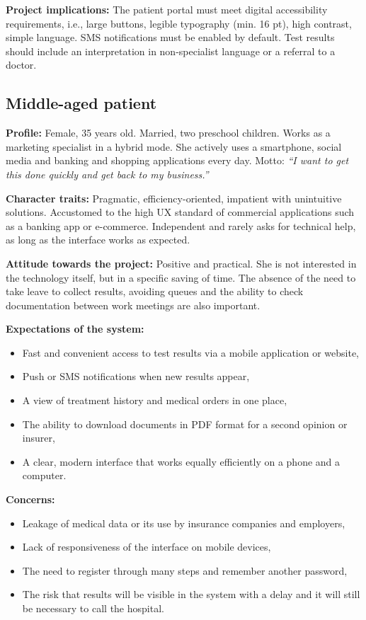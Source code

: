 \textbf{Project implications:} The patient portal must meet digital accessibility requirements, i.e., large buttons, legible typography (min. 16 pt), high contrast, simple language. SMS notifications must be enabled by default. Test results should include an interpretation in non-specialist language or a referral to a doctor.
\subsection{Middle-aged patient}

\textbf{Profile:} Female, 35 years old. Married, two preschool children. Works as a
marketing specialist in a hybrid mode. She actively uses a smartphone,
social media and banking and shopping applications every day. Motto:
\emph{``I want to get this done quickly and get back to my business.''}

\textbf{Character traits:} Pragmatic, efficiency-oriented, impatient with
unintuitive solutions. Accustomed to the high UX standard of commercial applications such as a banking app or e-commerce. Independent and rarely
asks for technical help, as long as the interface works as expected.

\textbf{Attitude towards the project:} Positive and practical. She is not interested in the technology itself,
but in a specific saving of time. The absence of the need to take leave to collect
results, avoiding queues and the ability to check documentation between work meetings are also important.

\textbf{Expectations of the system:}
\begin{itemize}
    \item Fast and convenient access to test results via a mobile application or website,
    \item Push or SMS notifications when new results appear,
    \item A view of treatment history and medical orders in one place,
    \item The ability to download documents in PDF format for a second opinion or insurer,
    \item A clear, modern interface that works equally efficiently on a phone and a computer.
\end{itemize}

\textbf{Concerns:}
\begin{itemize}
    \item Leakage of medical data or its use by insurance companies and employers,
    \item Lack of responsiveness of the interface on mobile devices,
    \item The need to register through many steps and remember another password,
    \item The risk that results will be visible in the system with a delay and it will still be necessary to call the hospital.
\end{itemize}

